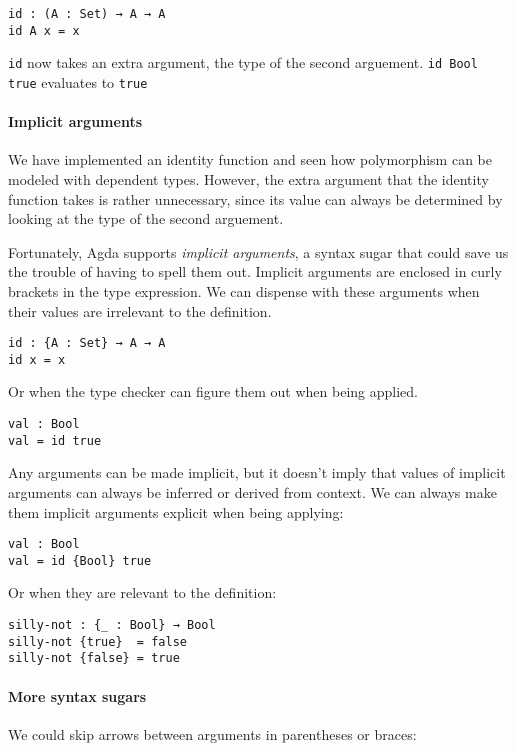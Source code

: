 \documentclass[12pt, a4paper]{article}
\begin{document}
\begin{lstlisting}
id : (A : Set) → A → A
id A x = x
\end{lstlisting}

{\lstinline|id|} now takes an extra argument, the type of the second arguement.
{\lstinline|id Bool true|} evaluates to {\lstinline|true|}

\paragraph{Implicit arguments}

We have implemented an identity function and seen how polymorphism can be modeled
with dependent types. However, the extra argument that the identity function
takes is rather unnecessary, since its value can always be determined by looking
at the type of the second arguement.

Fortunately, Agda supports \textit{implicit arguments}, a syntax sugar that could
save us the trouble of having to spell them out. Implicit arguments are enclosed
in curly brackets in the type expression. We can dispense with these arguments
when their values are irrelevant to the definition.

\begin{lstlisting}
id : {A : Set} → A → A
id x = x
\end{lstlisting}

Or when the type checker can figure them out when being applied.

\begin{lstlisting}
val : Bool
val = id true
\end{lstlisting}

Any arguments can be made implicit, but it doesn't imply that values of
implicit arguments can always be inferred or derived from context. We can always
make them implicit arguments explicit when being applying:

\begin{lstlisting}
val : Bool
val = id {Bool} true
\end{lstlisting}

Or when they are relevant to the definition:

\begin{lstlisting}
silly-not : {_ : Bool} → Bool
silly-not {true}  = false
silly-not {false} = true
\end{lstlisting}

\paragraph{More syntax sugars}
We could skip arrows between arguments in parentheses or braces:
\end{document}
